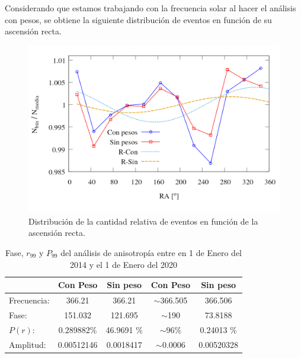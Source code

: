 	Considerando que estamos trabajando con la frecuencia solar al hacer el análisis con pesos, se obtiene la siguiente distribución de eventos en función de su ascensión recta.
	\begin{figure}[H]
		\centering
		\includegraphics[width=0.75\linewidth]{eventos_clasificados_por_RA_v4.png}
		\caption{Distribución de la cantidad relativa de eventos en función de la ascensión recta.}
	\end{figure}







\begin{table}[H]
\centering
\begin{tabular}{l|c|c|c|c}
				& Con Peso 		& Sin peso 		& Con Peso 		& Sin peso 		\\ \hline
Frecuencia:		& 366.21 		& 366.21 		& $\sim$366.505 & 366.506 		\\
Fase:			& 151.032 		& 121.695		& $\sim$190 	& 73.8188		\\
$P(r)$:		   & 0.289882\%	  & 46.9691 \% 	& $\sim$96\%	& 0.24013 \% 	\\
Amplitud:		& 0.00512146	& 0.0018417		& $\sim$0.0006	& 0.00520328	\\
\end{tabular}
\caption{Fase, $r_{99}$ y $P_{99}$ del análisis de anisotropía entre en 1 de Enero del 2014 y el 1 de Enero del 2020}
\label{tabla:pico}
\end{table}


